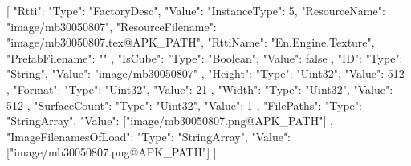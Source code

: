 [{
        "Rtti": {
            "Type": "FactoryDesc",
            "Value": {
                "InstanceType": 5,
                "ResourceName": "image/mb30050807",
                "ResourceFilename": "image/mb30050807.tex@APK_PATH",
                "RttiName": "En.Engine.Texture",
                "PrefabFilename": ""
            }
        },
        "IsCube": {
            "Type": "Boolean",
            "Value": false
        },
        "ID": {
            "Type": "String",
            "Value": "image/mb30050807"
        },
        "Height": {
            "Type": "Uint32",
            "Value": 512
        },
        "Format": {
            "Type": "Uint32",
            "Value": 21
        },
        "Width": {
            "Type": "Uint32",
            "Value": 512
        },
        "SurfaceCount": {
            "Type": "Uint32",
            "Value": 1
        },
        "FilePaths": {
            "Type": "StringArray",
            "Value": ["image/mb30050807.png@APK_PATH"]
        },
        "ImageFilenamesOfLoad": {
            "Type": "StringArray",
            "Value": ["image/mb30050807.png@APK_PATH"]
        }
    }]